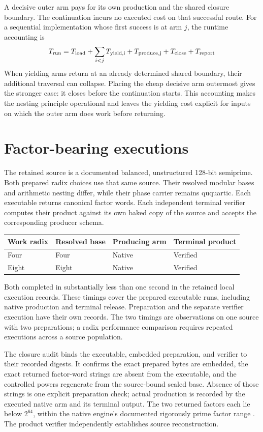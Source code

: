 \documentclass[12pt]{article}
\begin{document}
A decisive outer arm pays for its own production and the shared closure boundary. The continuation incurs no executed cost on that successful route. For a sequential implementation whose first success is at arm $j$, the runtime accounting is
\[
T_{\rm run}=T_{\rm load}+\sum_{i<j}T_{\rm yield,i}
+T_{\rm produce,j}+T_{\rm close}+T_{\rm report}
\]
When yielding arms return at an already determined shared boundary, their additional traversal can collapse. Placing the cheap decisive arm outermost gives the stronger case: it closes before the continuation starts. This accounting makes the nesting principle operational and leaves the yielding cost explicit for inputs on which the outer arm does work before returning.

\section*{Factor-bearing executions}

The retained source is a documented balanced, unstructured 128-bit semiprime. Both prepared radix choices use that same source. Their resolved modular bases and arithmetic nesting differ, while their phase carrier remains ququartic. Each executable returns canonical factor words. Each independent terminal verifier computes their product against its own baked copy of the source and accepts the corresponding producer schema.

\begin{center}
\begin{tabular}{@{}llll@{}}
\toprule
Work radix & Resolved base & Producing arm & Terminal product\\
\midrule
Four & Four & Native & Verified\\
Eight & Eight & Native & Verified\\
\bottomrule
\end{tabular}
\end{center}

Both completed in substantially less than one second in the retained local execution records. These timings cover the prepared executable runs, including native production and terminal release. Preparation and the separate verifier execution have their own records. The two timings are observations on one source with two preparations; a radix performance comparison requires repeated executions across a source population.

The closure audit binds the executable, embedded preparation, and verifier to their recorded digests. It confirms the exact prepared bytes are embedded, the exact returned factor-word strings are absent from the executable, and the controlled powers regenerate from the source-bound scaled base. Absence of those strings is one explicit preparation check; actual production is recorded by the executed native arm and its terminal output. The two returned factors each lie below $2^{64}$, within the native engine's documented rigorously prime factor range \cite{pari}. The product verifier independently establishes source reconstruction.
\end{document}
